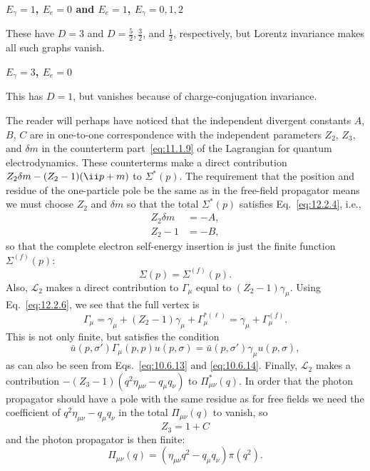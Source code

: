 \par\noindent\textbf{$E_\gamma=1$, $E_e=0$ and $E_e=1$, $E_\gamma=0,1,2$}\par
These have $D=3$ and $D=\tfrac52,\tfrac32$, and $\tfrac12$, respectively,
but Lorentz invariance makes all such graphs vanish.

\par\noindent\textbf{$E_\gamma=3$, $E_e=0$}\par
This has $D=1$, but vanishes because of charge-conjugation invariance.

The reader will perhaps have noticed that the independent divergent
constants $A$, $B$, $C$ are in one-to-one correspondence with the independent
parameters $Z_2$, $Z_3$, and $\delta m$ in the counterterm
part~\eqref{eq:11.1.9} of
the Lagrangian for quantum electrodynamics. These counterterms make a direct
contribution $Z_2\delta m-(Z_2-1)(\ii\sl{p}+m)$ to $\Sigma^*(p)$. The
requirement that the position and residue of the one-particle pole be the
same as in the free-field propagator means we must choose $Z_2$ and
$\delta m$ so that the total $\Sigma^*(p)$ satisfies Eq.~\eqref{eq:12.2.4},
i.e.,
\begin{align}
  Z_2\delta m&=-A,
  \tag{12.2.9}\label{eq:12.2.9}\\
  Z_2-1&=-B,
  \tag{12.2.10}\label{eq:12.2.10}
\end{align}
so that the complete electron self-energy insertion is just the finite
function $\Sigma^{(f)}(p)$:
\begin{equation}
  \Sigma(p)=\Sigma^{(f)}(p).
  \tag{12.2.11}\label{eq:12.2.11}
\end{equation}
Also, $\mathcal{L}_2$ makes a direct contribution to $\Gamma_\mu$ equal to
$(Z_2-1)\gamma_\mu$. Using Eq.~\eqref{eq:12.2.6}, we see that the full
vertex is
\begin{equation}
  \Gamma_\mu=\gamma_\mu+(Z_2-1)\gamma_\mu+\Gamma_\mu^{*(\ell)}
  =\gamma_\mu+\Gamma_\mu^{(f)}.
  \tag{12.2.12}\label{eq:12.2.12}
\end{equation}
This is not only finite, but satisfies the condition
\begin{equation}
  \bar u(p,\sigma')\Gamma_\mu(p,p)u(p,\sigma)
  =\bar u(p,\sigma')\gamma_\mu u(p,\sigma),
  \tag{12.2.13}\label{eq:12.2.13}
\end{equation}
as can also be seen from Eqs.~\eqref{eq:10.6.13} and
\eqref{eq:10.6.14}. Finally,
$\mathcal{L}_2$ makes a contribution
$-(Z_3-1)(q^2\eta_{\mu\nu}-q_\mu q_\nu)$ to $\Pi_{\mu\nu}^*(q)$. In order
that the photon propagator should have a pole with the same residue as for
free fields we need the coefficient of $q^2\eta_{\mu\nu}-q_\mu q_\nu$ in
the total $\Pi_{\mu\nu}(q)$ to vanish, so
\begin{equation}
  Z_3=1+C
  \tag{12.2.14}\label{eq:12.2.14}
\end{equation}
and the photon propagator is then finite:
\begin{equation}
  \Pi_{\mu\nu}(q)=(\eta_{\mu\nu}q^2-q_\mu q_\nu)\pi(q^2).
  \tag{12.2.15}\label{eq:12.2.15}
\end{equation}

